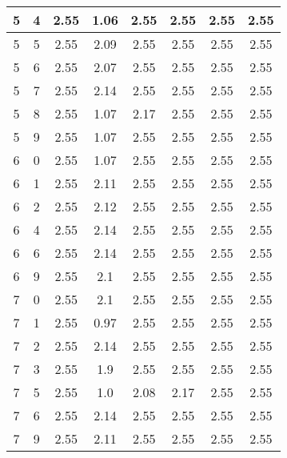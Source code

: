 \begin{longtable}{|c|c||c||c|c|c|c||c|}
	5 & 4 & 2.55 & 1.06 & 2.55 & 2.55 & 2.55 & 2.55 \\ \hline
	5 & 5 & 2.55 & 2.09 & 2.55 & 2.55 & 2.55 & 2.55 \\ \hline
	5 & 6 & 2.55 & 2.07 & 2.55 & 2.55 & 2.55 & 2.55 \\ \hline
	5 & 7 & 2.55 & 2.14 & 2.55 & 2.55 & 2.55 & 2.55 \\ \hline
	5 & 8 & 2.55 & 1.07 & 2.17 & 2.55 & 2.55 & 2.55 \\ \hline
	5 & 9 & 2.55 & 1.07 & 2.55 & 2.55 & 2.55 & 2.55 \\ \hline
	6 & 0 & 2.55 & 1.07 & 2.55 & 2.55 & 2.55 & 2.55 \\ \hline
	6 & 1 & 2.55 & 2.11 & 2.55 & 2.55 & 2.55 & 2.55 \\ \hline
	6 & 2 & 2.55 & 2.12 & 2.55 & 2.55 & 2.55 & 2.55 \\ \hline
	6 & 4 & 2.55 & 2.14 & 2.55 & 2.55 & 2.55 & 2.55 \\ \hline
	6 & 6 & 2.55 & 2.14 & 2.55 & 2.55 & 2.55 & 2.55 \\ \hline
	6 & 9 & 2.55 & 2.1 & 2.55 & 2.55 & 2.55 & 2.55 \\ \hline
	7 & 0 & 2.55 & 2.1 & 2.55 & 2.55 & 2.55 & 2.55 \\ \hline
	7 & 1 & 2.55 & 0.97 & 2.55 & 2.55 & 2.55 & 2.55 \\ \hline
	7 & 2 & 2.55 & 2.14 & 2.55 & 2.55 & 2.55 & 2.55 \\ \hline
	7 & 3 & 2.55 & 1.9 & 2.55 & 2.55 & 2.55 & 2.55 \\ \hline
	7 & 5 & 2.55 & 1.0 & 2.08 & 2.17 & 2.55 & 2.55 \\ \hline
	7 & 6 & 2.55 & 2.14 & 2.55 & 2.55 & 2.55 & 2.55 \\ \hline
	7 & 9 & 2.55 & 2.11 & 2.55 & 2.55 & 2.55 & 2.55 \\ \hline
\end{longtable}
\clearpage{}
